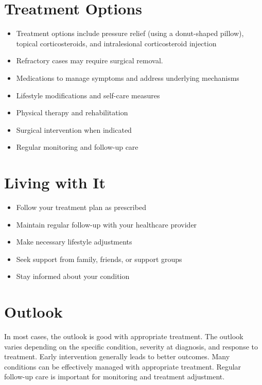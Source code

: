 \section{Treatment Options}
\begin{itemize}[noitemsep]
  \item Treatment options include pressure relief (using a donut-shaped pillow), topical corticosteroids, and intralesional corticosteroid injection
  \item Refractory cases may require surgical removal.
  \item Medications to manage symptoms and address underlying mechanisms
  \item Lifestyle modifications and self-care measures
  \item Physical therapy and rehabilitation
  \item Surgical intervention when indicated
  \item Regular monitoring and follow-up care
\end{itemize}
\section{Living with It}
\begin{itemize}[noitemsep]
  \item Follow your treatment plan as prescribed
  \item Maintain regular follow-up with your healthcare provider
  \item Make necessary lifestyle adjustments
  \item Seek support from family, friends, or support groups
  \item Stay informed about your condition
\end{itemize}
\section{Outlook}
In most cases, the outlook is good with appropriate treatment. The outlook varies depending on the specific condition, severity at diagnosis, and response to treatment. Early intervention generally leads to better outcomes. Many conditions can be effectively managed with appropriate treatment. Regular follow-up care is important for monitoring and treatment adjustment.
